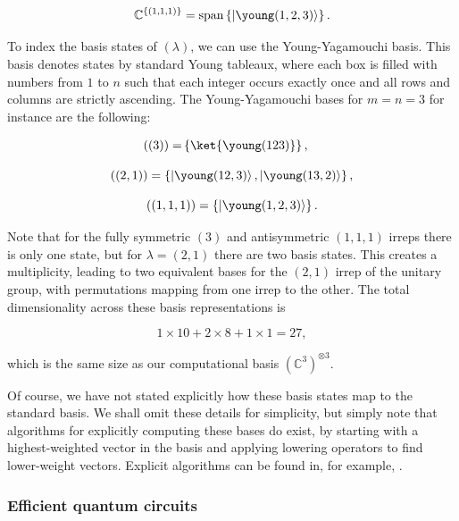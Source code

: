 \begin{equation}
\mathbb{C}^{\{(1,1,1)\}} = \textrm{span}\left\{\left|\young(1,2,3)\right\rangle\right\}.
\end{equation}

To index the basis states of $(\lambda)$, we can use the Young-Yagamouchi basis. This basis denotes states by standard Young tableaux, where each box is filled with numbers from $1$ to $n$ such that each integer occurs exactly once and all rows and columns are strictly ascending. The Young-Yagamouchi bases for $m=n=3$ for instance are the following:

\begin{align}
((3)) = &\left\{\ket{\young(123)}\right\},
\end{align}

\begin{equation}
((2,1)) = \left\{\left|\young(12,3)\right\rangle, \left|\young(13,2)\right\rangle\right\},
\end{equation}

\begin{equation}
((1,1,1)) = \left\{\left|\young(1,2,3)\right\rangle\right\}.
\end{equation}

Note that for the fully symmetric $(3)$ and antisymmetric $(1,1,1)$ irreps there is only one state, but for $\lambda = (2,1)$ there are two basis states. This creates a multiplicity, leading to two equivalent bases for the $(2,1)$ irrep of the unitary group, with permutations mapping from one irrep to the other. The total dimensionality across these basis representations is

\begin{equation}
1\times 10+2\times 8 + 1\times 1 = 27,
\end{equation}

\noindent which is the same size as our computational basis $(\mathbb{C}^3)^{\otimes 3}$.

Of course, we have not stated explicitly how these basis states map to the standard basis. We shall omit these details for simplicity, but simply note that algorithms for explicitly computing these bases do exist, by starting with a highest-weighted vector in the basis and applying lowering operators to find lower-weight vectors. Explicit algorithms can be found in, for example, \cite{alex2011, dhand2015}.

\subsubsection{Efficient quantum circuits}

